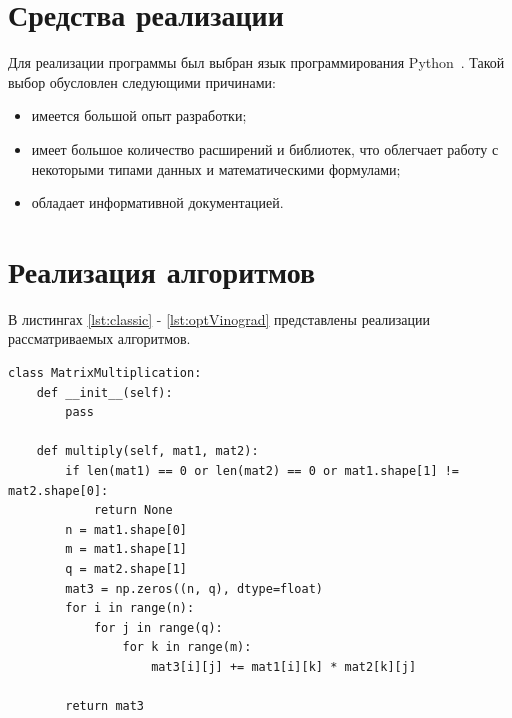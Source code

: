 \documentclass[a4paper,oneside,14pt]{extreport}
\begin{document}
\section{Средства реализации}
Для реализации программы был выбран язык программирования Python~\cite{python}. Такой выбор обусловлен следующими причинами:
\begin{itemize}
	\item имеется большой опыт разработки;
	\item имеет большое количество расширений и библиотек, что облегчает работу с некоторыми типами данных и математическими формулами;
	\item обладает информативной документацией.
\end{itemize}

\section{Реализация алгоритмов}
В листингах \ref{lst:classic} - \ref{lst:optVinograd} представлены реализации рассматриваемых алгоритмов.
\newpage
\captionsetup{singlelinecheck=false}
\begin{lstlisting}[caption=Классический алгоритм, label={lst:classic}]
class MatrixMultiplication:
	def __init__(self):
		pass
	
	def multiply(self, mat1, mat2):
		if len(mat1) == 0 or len(mat2) == 0 or mat1.shape[1] != mat2.shape[0]:
			return None
		n = mat1.shape[0]
		m = mat1.shape[1]
		q = mat2.shape[1]
		mat3 = np.zeros((n, q), dtype=float)
		for i in range(n):
			for j in range(q):
				for k in range(m):
					mat3[i][j] += mat1[i][k] * mat2[k][j]
		
		return mat3

\end{lstlisting}
\end{document}
